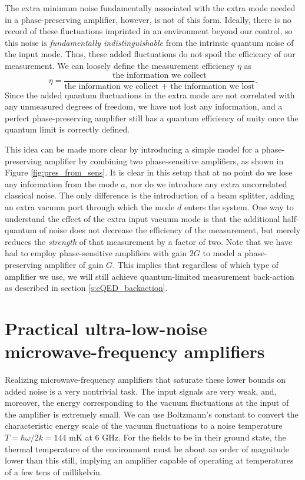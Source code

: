 The extra minimum noise fundamentally associated with the extra mode needed in a phase-preserving amplifier, however, is not of this form.  Ideally, there is no record of these fluctuations imprinted in an environment beyond our control, so this noise is \textit{fundamentally indistinguishable} from the intrinsic quantum noise of the input mode.  Thus, these added fluctuations do not spoil the efficiency of our measurement.  We can loosely define the measurement efficiency $\eta$ as
\begin{equation}
\eta = \frac{\textrm{the information we collect}}{\textrm{the information we collect } + \textrm{ the information we lost}}.
\label{eq:eta_heur}
\end{equation}
Since the added quantum fluctuations in the extra mode are not correlated with any unmeasured degrees of freedom, we have not lost any information, and a perfect phase-preserving amplifier still has a quantum efficiency of unity once the quantum limit is correctly defined.

This idea can be made more clear by introducing a simple model for a phase-preserving amplifier by combining two phase-sensitive amplifiers, as shown in Figure \ref{fig:pres_from_sens}.  It is clear in this setup that at no point do we lose any information from the mode $a$, nor do we introduce any extra uncorrelated classical noise.  The only difference is the introduction of a beam splitter, adding an extra vacuum port through which the mode $d$ enters the system.  One way to understand the effect of the extra input vacuum mode is that the additional half-quantum of noise does not decrease the efficiency of the measurement, but merely reduces the \textit{strength} of that measurement by a factor of two.  Note that we have had to employ phase-sensitive amplifiers with gain $2G$ to model a phase-preserving amplifier of gain $G$.  This implies that regardless of which type of amplifier we use, we will still achieve quantum-limited measurement back-action as described in section \ref{s:cQED_backaction}.

\section{Practical ultra-low-noise microwave-frequency amplifiers}

Realizing microwave-frequency amplifiers that saturate these lower bounds on added noise is a very nontrivial task.  The input signals are very weak, and, moreover, the energy corresponding to the vacuum fluctuations at the input of the amplifier is extremely small.  We can use Boltzmann's constant to convert the characteristic energy scale of the vacuum fluctuations to a noise temperature $T = \hbar \omega / 2 k = 144$ mK at 6 GHz.  For the fields to be in their ground state, the thermal temperature of the environment must be about an order of magnitude lower than this still, implying an amplifier capable of operating at temperatures of a few tens of millikelvin.


